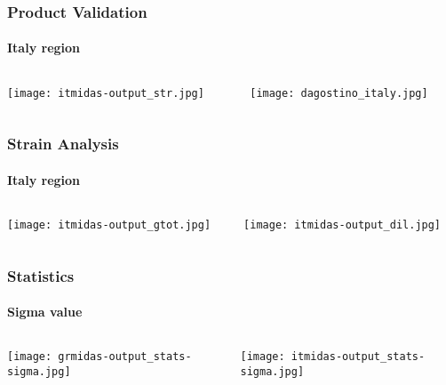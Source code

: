 \begin{frame}
 \frametitle{Product Validation}
 \framesubtitle{Italy region}
 \label{ch4:}
   
  \begin{columns}
    \begin{column}{0.5\textwidth}
      
      \texttt{[image: itmidas-output\_str.jpg]}   
    \end{column}
    \begin{column}{0.5\textwidth}
    \begin{center}
      
      \texttt{[image: dagostino\_italy.jpg]}     
    \end{center}
    \end{column}
  \end{columns}

\end{frame}
\note{}

\begin{frame}
 \frametitle{Strain Analysis}
 \framesubtitle{Italy region}
 \label{ch4:}
   
  \begin{columns}
    \begin{column}{0.5\textwidth}
      \texttt{[image: itmidas-output\_gtot.jpg]}   
    \end{column}
    \begin{column}{0.5\textwidth}
    \begin{center}
      \texttt{[image: itmidas-output\_dil.jpg]}     
    \end{center}
    \end{column}
  
  \end{columns}

\end{frame}
\note{}

\begin{frame}
 \frametitle{Statistics}
 \framesubtitle{Sigma value}
 \label{ch4:}
   
  \begin{columns}
    \begin{column}{0.5\textwidth}
      \texttt{[image: grmidas-output\_stats-sigma.jpg]}   
    \end{column}
    \begin{column}{0.5\textwidth}
    \begin{center}
      \texttt{[image: itmidas-output\_stats-sigma.jpg]}     
    \end{center}
    \end{column}
  
  \end{columns}

\end{frame}
\note{}

